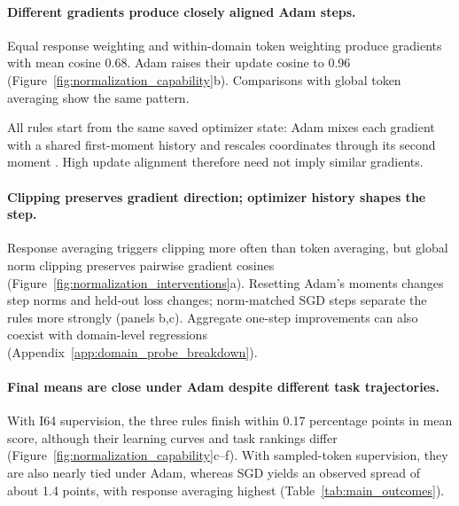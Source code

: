 \paragraph{Different gradients produce closely aligned Adam steps.}
Equal response weighting and within-domain token weighting produce gradients with mean cosine 0.68. Adam raises their update cosine to 0.96 (Figure~\ref{fig:normalization_capability}b). Comparisons with global token averaging show the same pattern.

All rules start from the same saved optimizer state: Adam mixes each gradient with a shared first-moment history and rescales coordinates through its second moment \citep{kingma2015adam}. High update alignment therefore need not imply similar gradients.

\paragraph{Clipping preserves gradient direction; optimizer history shapes the step.}
Response averaging triggers clipping more often than token averaging, but global norm clipping preserves pairwise gradient cosines (Figure~\ref{fig:normalization_interventions}a). Resetting Adam's moments changes step norms and held-out loss changes; norm-matched SGD steps separate the rules more strongly (panels b,c). Aggregate one-step improvements can also coexist with domain-level regressions (Appendix~\ref{app:domain_probe_breakdown}).



\paragraph{Final means are close under Adam despite different task trajectories.}
With I64 supervision, the three rules finish within 0.17 percentage points in mean score, although their learning curves and task rankings differ (Figure~\ref{fig:normalization_capability}c--f). With sampled-token supervision, they are also nearly tied under Adam, whereas SGD yields an observed spread of about 1.4 points, with response averaging highest (Table~\ref{tab:main_outcomes}).

\FloatBarrier
